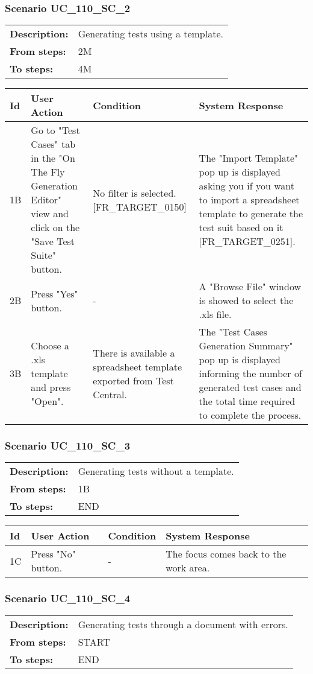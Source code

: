 \documentclass[a4paper,11pt]{article}
\newcommand{\bl}{\\ \hline}
\begin{document}
\subsubsection*{Scenario UC_110_SC_2}
\begin{tabular}{p{1in}p{4in}}
{\bf Description:} & Generating tests using a template. \\
{\bf From steps:} & 2M \\
{\bf To steps:} & 4M \\
\end{tabular}
 
\begin{tabular}{|p{0.8in}|p{1.6in}|p{1.6in}|p{1.6in}|}
\hline
Id & User Action & Condition & System Response  \bl 
1B & Go to "Test Cases" tab in the "On The Fly Generation Editor" view and click on the "Save Test Suite" button. & No filter is selected. [FR_TARGET_0150] & The "Import Template" pop up is displayed asking you if you want to import a spreadsheet template to generate the test suit based on it [FR_TARGET_0251]. \bl 
2B & Press "Yes" button. & - & A "Browse File" window is showed to select the .xls file. \bl 
3B & Choose a .xls template and press "Open". & There is available a spreadsheet template exported from Test Central. & The "Test Cases Generation Summary" pop up is displayed informing the number of generated test cases and the total time required to complete the process. \bl 
\end{tabular}
\subsubsection*{Scenario UC_110_SC_3}
\begin{tabular}{p{1in}p{4in}}
{\bf Description:} & Generating tests without a template. \\
{\bf From steps:} & 1B \\
{\bf To steps:} & END \\
\end{tabular}
 
\begin{tabular}{|p{0.8in}|p{1.6in}|p{1.6in}|p{1.6in}|}
\hline
Id & User Action & Condition & System Response  \bl 
1C & Press "No" button. & - & The focus comes back to the work area. \bl 
\end{tabular}
\subsubsection*{Scenario UC_110_SC_4}
\begin{tabular}{p{1in}p{4in}}
{\bf Description:} & Generating tests through a document with errors. \\
{\bf From steps:} & START \\
{\bf To steps:} & END \\
\end{tabular}
 
\end{document}
